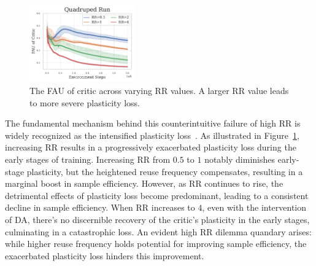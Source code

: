 \vspace{-0.5\baselineskip}
\begin{figure}
  \vspace{-1.5\baselineskip}  
  \includegraphics[width=0.4\textwidth]{Figures/4Solutions/FAU_High_RR_QR.pdf}
  \vspace{-1.5\baselineskip}
  \caption{The FAU of critic across varying RR values. A larger RR value leads to more severe plasticity loss.}
  \label{fig:FAU_High_RR}
\end{figure}
The fundamental mechanism behind this counterintuitive failure of high RR is widely recognized as the intensified plasticity loss~\citep{primacy_bias,dormant_neuron}.
As illustrated in Figure~\ref{fig:FAU_High_RR}, increasing RR results in a progressively exacerbated plasticity loss during the early stages of training.
Increasing RR from $0.5$ to $1$ notably diminishes early-stage plasticity, but the heightened reuse frequency compensates, resulting in a marginal boost in sample efficiency.
However, as RR continues to rise, the detrimental effects of plasticity loss become predominant, leading to a consistent decline in sample efficiency.
When RR increases to $4$, even with the intervention of DA, there's no discernible recovery of the critic's plasticity in the early stages, culminating in a catastrophic loss.
An evident high RR dilemma quandary arises: while higher reuse frequency holds potential for improving sample efficiency, the exacerbated plasticity loss hinders this improvement.



